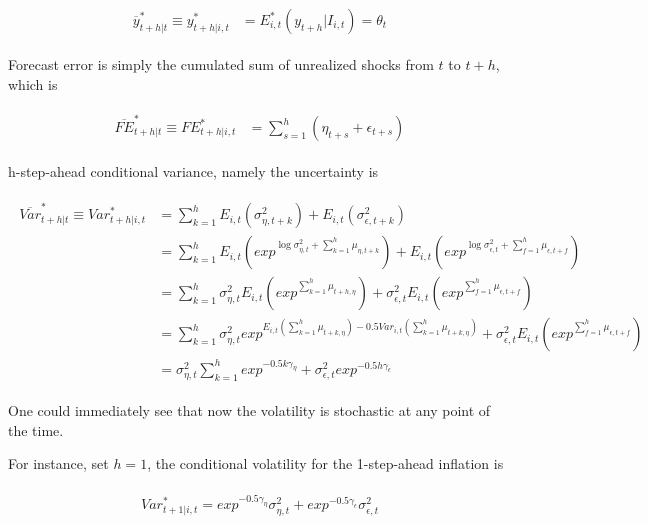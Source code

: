 \documentclass[]{article}
\begin{document}
\begin{eqnarray}
\begin{split}
\overline y^*_{t+h|t} \equiv y^*_{t+h|i,t} & =  E^*_{i,t}(y_{t+h}|I_{i,t}) = \theta_t 
\end{split}
\end{eqnarray}

Forecast error is simply the cumulated sum of unrealized shocks from $t$ to $t+h$, which is 

\begin{eqnarray}
\begin{split}
\overline{FE}^*_{t+h|t} \equiv  FE^*_{t+h|i,t} & =  \sum^{h}_{s=1} (\eta_{t+s} + \epsilon_{t+s})
\end{split}
\end{eqnarray}



 h-step-ahead conditional variance, namely the uncertainty is

\begin{eqnarray}
\begin{split}
\overline{Var}^*_{t+h|t} \equiv  Var^*_{t+h|i,t} & = \sum^{h}_{k=1} E_{i,t}(\sigma^2_{\eta,t+k}) +  E_{i,t}(\sigma^2_{\epsilon,t+k})  \\
& = \sum^{h}_{k=1} E_{i,t}(exp^{\log \sigma^2_{\eta,t}+\sum^h_{k=1}\mu_{\eta,t+k}}) +  E_{i,t}(exp^{\log \sigma^2_{\epsilon,t}+\sum^h_{f=1}\mu_{\epsilon,t+f}} ) \\
& = \sum^{h}_{k=1}\sigma^2_{\eta,t} E_{i,t}(exp^{\sum^h_{k=1}\mu_{t+h,\eta}}) +  \sigma^2_{\epsilon,t} E_{i,t}(exp^{\sum^h_{f=1}\mu_{\epsilon,t+f}} ) \\
& = \sum^{h}_{k=1}\sigma^2_{\eta,t}  exp^{E_{i,t}({\sum^h_{k=1}\mu_{t+k,\eta}})- 0.5Var_{i,t}(\sum^h_{k=1}\mu_{t+k,\eta})} +  \sigma^2_{\epsilon,t} E_{i,t}(exp^{\sum^h_{f=1}\mu_{\epsilon,t+f}} ) \\
& = \sigma^2_{\eta,t} \sum^{h}_{k=1} exp^{- 0.5k\gamma_{\eta}} +  \sigma^2_{\epsilon,t} exp^{- 0.5h\gamma_{\epsilon}} 
\end{split} 
\end{eqnarray}

One could immediately see that now the volatility is stochastic at any point of the time. 

For instance, set $h=1$, the conditional volatility for the 1-step-ahead inflation is 

\begin{eqnarray}
\begin{split}
Var^*_{t+1|i,t} =  exp^{- 0.5\gamma_{\eta}} \sigma^2_{\eta,t}  +  exp^{- 0.5\gamma_{\epsilon}} \sigma^2_{\epsilon,t} 
\end{split} 
\end{eqnarray}
\end{document}
